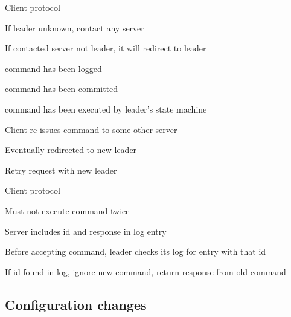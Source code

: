 \begin{frame}{Client protocol}

	\BI
	\item If leader unknown, contact any server
	\item If contacted server not leader, it will redirect to leader
	\EI
	
	\BI
	\item command has been logged
	\item command has been committed
	\item command has been executed by leader's state machine
	\EI
	
	\BI
	\item Client re-issues command to some other server
	\item Eventually redirected to new leader
	\item Retry request with new leader
	\EI

\end{frame}

\begin{frame}{Client protocol}

\BI
\item Must not execute command twice
\EI

\BI
\item Server includes id and response in log entry
\item Before accepting command, leader checks its log for entry with that id
\item If id found in log, ignore new command, return response from old command
\EI


\end{frame}

\subsection{Configuration changes}

